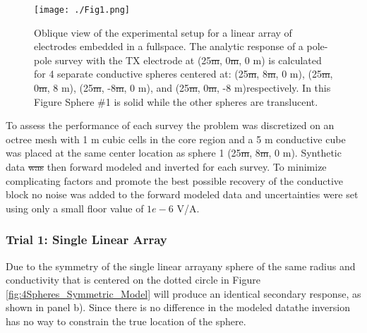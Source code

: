 \documentclass[preprint,authoryear,12pt]{elsarticle}
\providecommand{\DIFaddtex}[1]{{\protect\color{blue}\uwave{#1}}} %
\providecommand{\DIFdeltex}[1]{{\protect\color{red}\sout{#1}}}                      %
\providecommand{\DIFaddbegin}{} %
\providecommand{\DIFaddend}{} %
\providecommand{\DIFdelbegin}{} %
\providecommand{\DIFdelend}{} %
\providecommand{\DIFaddFL}[1]{\DIFadd{#1}} %
\providecommand{\DIFdelFL}[1]{\DIFdel{#1}} %
\providecommand{\DIFaddbeginFL}{} %
\providecommand{\DIFaddendFL}{} %
\providecommand{\DIFdelbeginFL}{} %
\providecommand{\DIFdelendFL}{} %
\providecommand{\DIFadd}[1]{\texorpdfstring{\DIFaddtex{#1}}{#1}} %
\providecommand{\DIFdel}[1]{\texorpdfstring{\DIFdeltex{#1}}{}} %
\begin{document}
\begin{figure}[htp]
   \begin{center}
      \DIFdelbeginFL %
\DIFdelendFL \DIFaddbeginFL \texttt{[image: ./Fig1.png]}
   \DIFaddendFL \end{center}
\caption{Oblique view of the experimental setup for a linear array of electrodes embedded in a fullspace. The analytic response of a pole-pole survey with the TX electrode at (25\DIFdelbeginFL \DIFdelFL{m}\DIFdelendFL , 0\DIFdelbeginFL \DIFdelFL{m}\DIFdelendFL , 0 m) is calculated for 4 separate conductive spheres centered at: (25\DIFdelbeginFL \DIFdelFL{m}\DIFdelendFL , 8\DIFdelbeginFL \DIFdelFL{m}\DIFdelendFL , 0 m), (25\DIFdelbeginFL \DIFdelFL{m}\DIFdelendFL , 0\DIFdelbeginFL \DIFdelFL{m}\DIFdelendFL , 8 m), (25\DIFdelbeginFL \DIFdelFL{m}\DIFdelendFL , -8\DIFdelbeginFL \DIFdelFL{m}\DIFdelendFL , 0 m), and (25\DIFdelbeginFL \DIFdelFL{m}\DIFdelendFL , 0\DIFdelbeginFL \DIFdelFL{m}\DIFdelendFL , -8 m)\DIFaddbeginFL \DIFaddFL{, }\DIFaddendFL respectively. In this Figure Sphere \#1 is solid while the other spheres are translucent.}
\label{fig:4Spheres_ObliqueView}
\end{figure}

To assess the performance of each survey the problem was discretized on an octree mesh with 1 m cubic cells in the core region and a 5 m conductive cube was placed at the same center location as sphere 1 (25\DIFdelbegin \DIFdel{m}\DIFdelend , 8\DIFdelbegin \DIFdel{m}\DIFdelend , 0 m). Synthetic data \DIFdelbegin \DIFdel{was }\DIFdelend \DIFaddbegin \DIFadd{were }\DIFaddend then forward modeled and inverted for each survey. To minimize complicating factors and promote the best possible recovery of the conductive block no noise was added to the forward modeled data and uncertainties were set using only a small floor value of \DIFdelbegin \DIFdel{$1e-6$ }\DIFdelend \DIFaddbegin \DIFadd{$1 \times 10^{\text{-6}}$ }\DIFaddend V/A.


\subsubsection{Trial 1: Single Linear Array}
\label{sec:TheoreticalAnalysis_Trial1_SingleLinearArray}

Due to the symmetry of the single linear array\DIFaddbegin \DIFadd{, }\DIFaddend any sphere of the same radius and conductivity that is centered on the dotted circle in Figure \ref{fig:4Spheres_Symmetric_Model} will produce an identical secondary response, as shown in panel b). Since there is no difference in the modeled data\DIFaddbegin \DIFadd{, }\DIFaddend the inversion has no way to constrain the true location of the sphere.
\end{document}
